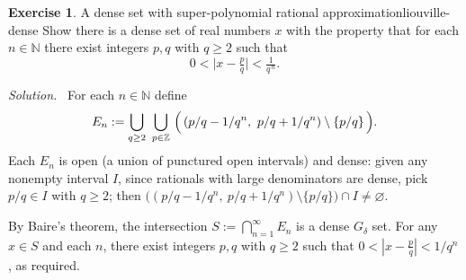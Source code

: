 \documentclass[11pt,a4paper]{article}
\theoremstyle{definition}
\newtheorem{exercise}{Exercise} %
\theoremstyle{definition}
\theoremstyle{plain}
\theoremstyle{remark}
\newenvironment{solution}{\par\noindent\textit{Solution.}\ }{\par\vspace{0.5em}}
\begin{document}
\begin{exercise}{A dense set with super-polynomial rational approximation}{liouville-dense}
	Show there is a dense set of real numbers $x$ with the property that for each $n\in\mathbb N$
	there exist integers $p,q$ with $q\ge2$ such that
	\[
	0<\bigl|x-\tfrac{p}{q}\bigr|<\tfrac{1}{q^{\,n}}.
	\]
\end{exercise}

\begin{solution}
	For each $n\in\mathbb N$ define
	\[
	E_n:=\bigcup_{q\ge2}\ \bigcup_{p\in\mathbb Z}\ \Bigl(\,(p/q-1/q^n,\ p/q+1/q^n)\setminus\{p/q\}\,\Bigr).
	\]
	Each $E_n$ is open (a union of punctured open intervals) and dense: given any nonempty interval $I$,
	since rationals with large denominators are dense, pick $p/q\in I$ with $q\ge2$; then
	$\bigl((p/q-1/q^n,\ p/q+1/q^n)\setminus\{p/q\}\bigr)\cap I\ne\varnothing$.
	
	By Baire’s theorem, the intersection $S:=\bigcap_{n=1}^\infty E_n$ is a dense $G_\delta$ set.
	For any $x\in S$ and each $n$, there exist integers $p,q$ with $q\ge2$ such that
	$0<|x-\tfrac{p}{q}|<1/q^n$, as required.
\end{solution}
	
	
	
\end{document}
